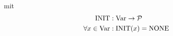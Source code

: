 \begin{enumerate}
\begin{enumerate}
                mit \begin{align*}
                    \text{INIT} & : \operatorname{Var} \to \mathcal{P} \\
                    \forall x \in \operatorname{Var} & : \text{INIT}(x) = \text{NONE}
                \end{align*}
        \end{enumerate}
\end{enumerate}
